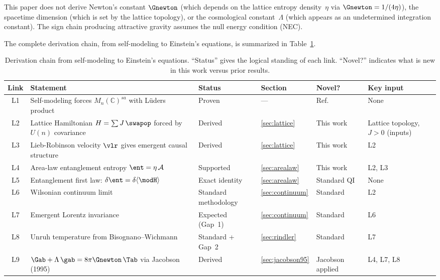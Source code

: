 This paper does not derive Newton's constant $\Gnewton$ (which depends on
the lattice entropy density~$\eta$ via $\Gnewton = 1/(4\eta)$), the
spacetime dimension (which is set by the lattice topology), or the
cosmological constant~$\Lambda$ (which appears as an undetermined
integration constant).  The sign chain producing attractive gravity
assumes the null energy condition (NEC).

The complete derivation chain, from self-modeling to Einstein's equations,
is summarized in Table~\ref{tab:chain}.

\begin{table}
\caption{Derivation chain from self-modeling to Einstein's equations.
``Status'' gives the logical standing of each link. ``Novel?'' indicates
what is new in this work versus prior results.
\label{tab:chain}}
\begin{ruledtabular}
\begin{tabular}{clllll}
Link & Statement & Status & Section & Novel? & Key input \\ \hline
L1 & Self-modeling forces $M_n(\mathbb{C})^{sa}$ with L\"uders product
   & Proven & --- & Ref.~\cite{Paper5} & None \\
L2 & Lattice Hamiltonian $H = \sum J\,\swapop$ forced by $U(n)$ covariance
   & Derived & \ref{sec:lattice} & This work & Lattice topology, $J>0$ (inputs) \\
L3 & Lieb-Robinson velocity $\vlr$ gives emergent causal structure
   & Derived & \ref{sec:lattice} & This work & L2 \\
L4 & Area-law entanglement entropy $\ent = \eta\,\mathcal{A}$
   & Supported & \ref{sec:arealaw} & This work & L2, L3 \\
L5 & Entanglement first law: $\delta\ent = \delta\langle\modH\rangle$
   & Exact identity & \ref{sec:arealaw} & Standard QI & None \\
L6 & Wilsonian continuum limit
   & Standard methodology & \ref{sec:continuum} & Standard & L2 \\
L7 & Emergent Lorentz invariance
   & Expected (Gap~1) & \ref{sec:continuum} & Standard & L6 \\
L8 & Unruh temperature from Bisognano--Wichmann
   & Standard + Gap~2 & \ref{sec:rindler}
   & Standard~\cite{BisognanoWichmann1976} & L7 \\
L9 & $\Gab + \Lambda\,\gab = 8\pi\Gnewton\,\Tab$ via Jacobson (1995)
   & Derived & \ref{sec:jacobson95} & Jacobson~\cite{Jacobson1995} applied
   & L4, L7, L8 \\
\end{tabular}
\end{ruledtabular}
\end{table}

